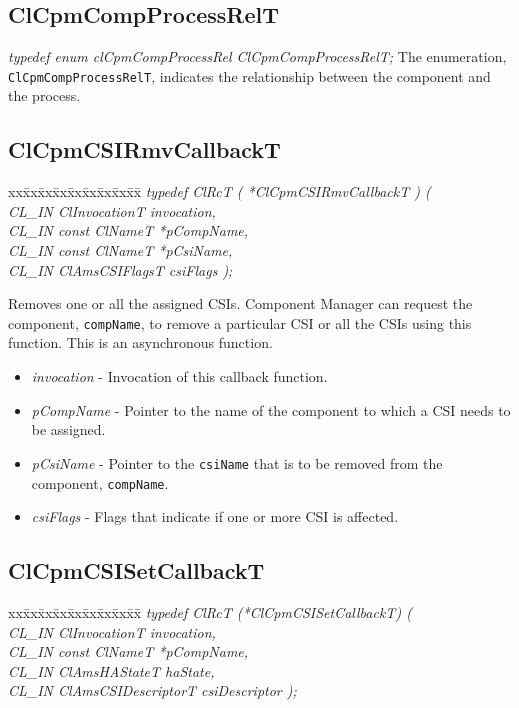 \subsection{ClCpmCompProcessRelT}
{\textit{typedef enum cl\-Cpm\-Comp\-Process\-Rel  Cl\-Cpm\-Comp\-Process\-Rel\-T;}
\newline
\newline
The enumeration, {\tt{ClCpmCompProcessRelT}}, indicates the relationship between the component and the process. 


\subsection{ClCpmCSIRmvCallbackT}
\begin{tabbing}
  xx\=xx\=xx\=xx\=xx\=xx\=xx\=xx\=xx\=\kill
    \textit{typedef ClRcT ( *ClCpmCSIRmvCallbackT ) (}\\
    \>\>\>\>\textit{CL\_IN ClInvocationT invocation,}\\
    \>\>\>\>\textit{CL\_IN const ClNameT *pCompName,}\\
    \>\>\>\>\textit{CL\_IN const ClNameT *pCsiName,}\\
    \>\>\>\>\textit{CL\_IN ClAmsCSIFlagsT csiFlags );}\\
    \end{tabbing}
Removes one or all the assigned CSIs. Component Manager can request the component, {\tt{comp\-Name}}, to remove a particular CSI or all 
the CSIs using this function. This is an asynchronous function.
\begin{itemize}
\item
\textit{invocation} - Invocation of this callback function.
\item
\textit{p\-Comp\-Name} - Pointer to the name of the component to which a CSI needs to be assigned.
\item
\textit{p\-Csi\-Name} - Pointer to the {\tt{csi\-Name}} that is to be removed from the component, {\tt{comp\-Name}}.
\item
\textit{csi\-Flags} - Flags that indicate if one or more CSI is affected. 
\end{itemize}

\subsection{ClCpmCSISetCallbackT}
  \begin{tabbing}
xx\=xx\=xx\=xx\=xx\=xx\=xx\=xx\=xx\=\kill
    \textit{typedef ClRcT (*ClCpmCSISetCallbackT) (}\\
    \>\>\>\>\textit{CL\_IN ClInvocationT invocation,}\\
    \>\>\>\>\textit{CL\_IN const ClNameT *pCompName,}\\
    \>\>\>\>\textit{CL\_IN ClAmsHAStateT haState,}\\
    \>\>\>\>\textit{CL\_IN ClAmsCSIDescriptorT csiDescriptor );}\\
    \end{tabbing}

}
